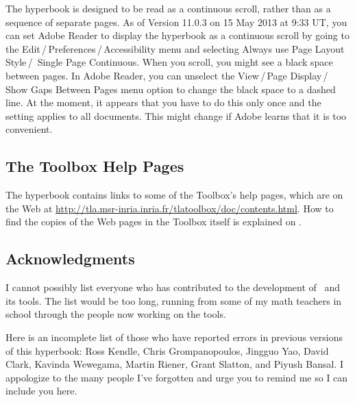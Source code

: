 \documentclass[fleqn,leqno]{article}
\begin{document}
The hyperbook is designed to be read as a continuous scroll, rather
than as a sequence of separate pages.  As of Version 11.0.3 on 15 May
2013 at 9:33 UT, you can set Adobe Reader to display the hyperbook as
a continuous scroll by going to the
\textsf{Edit\,/\,Preferences\,/\,Accessibility} menu and selecting
\textsf{Always use Page Layout Style\,/\, Single Page Continuous}.
When you scroll, you might see a black space between pages.  In Adobe
Reader, you can unselect the \textsf{View\,/\,Page Display\,/\,Show
Gaps Between Pages} menu option to change the black space to a dashed
line.  At the moment, it appears that you have to do this only once
and the setting applies to all documents.  This might change if Adobe
learns that it is too convenient.


\subsection*{The Toolbox Help Pages} 

The hyperbook contains links to some of the Toolbox's help pages, which
are 
on the Web at 
  \hyperref{http://tla.msr-inria.inria.fr/tlatoolbox/doc/contents.html}{}{}%
   {http://tla.msr-inria.inria.fr/tlatoolbox/doc/contents.html}.
How to find the copies of the Web pages in the Toolbox itself
is explained on .

\subsection*{Acknowledgments}

I cannot possibly list everyone who has contributed to the development
of \tlaplus\ and its tools.  The list would be too long, running from
some of my math teachers in school through the people now working on
the tools.

Here is an incomplete list of those who have reported errors in
previous versions of this hyperbook: Ross Kendle, Chris
Grompanopoulos, Jingguo Yao, David Clark, Kavinda Wewegama, Martin
Riener, Grant Slatton, and Piyush Bansal.  I appologize to the many people I've
forgotten and urge you to remind me so I can include you here.


\vspace{2em}

\noindent
{}
\end{document}

